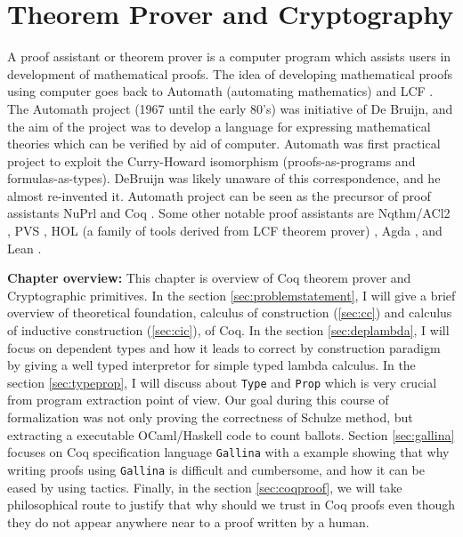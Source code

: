 \chapter{Theorem Prover and Cryptography}
\label{cha:theorem_crypto}
 

A proof assistant or theorem prover is a computer program which assists users in development 
of mathematical proofs. The idea of 
developing mathematical proofs using computer goes back to Automath (automating mathematics)
\citep{deBruijn1983} and LCF \citep{Milner:1972:IAS:942578.807067}. The 
Automath project (1967 until the early 80's)  was initiative of De Bruijn, and the aim of the project was to 
develop a language for expressing mathematical theories which can be verified by aid of computer.  
Automath was first 
practical project to exploit the Curry-Howard isomorphism (proofs-as-programs and formulas-as-types). 
DeBruijn  was likely unaware of this correspondence, and he almost re-invented it.
Automath project can be seen as the precursor of
 proof assistants NuPrl \citep{Constable:1986:IMN:10510} and Coq \citep{Bertot:2004:ITP}.  
 Some other notable  proof assistants are 
 Nqthm/ACl2 \citep{507872}, PVS \citep{Owre:1992:PPV:648230.752639},
 HOL (a family of tools derived from LCF theorem prover) \citep{Slind:2008:BOH:1459784.1459792}
 \citep{Harrison:1996:HLT:646184.682934} \citep{Nipkow:2002:IHP},
 Agda \citep{Norell:2008:DTP:1813347.1813352}, and Lean \citep{10.1007/978-3-319-21401-6_26}.


\textbf{Chapter overview:}
 This chapter is overview of Coq theorem prover and Cryptographic primitives. 
 In the section \ref{sec:problemstatement}, I will give a brief overview of 
 theoretical foundation, calculus of construction (\ref{sec:cc}) and calculus of inductive 
 construction (\ref{sec:cic}), of Coq. In the section \ref{sec:deplambda}, I will focus 
 on dependent types and  how it leads to correct by construction paradigm
 by giving a well typed interpretor for simple typed lambda calculus. 
 In the section \ref{sec:typeprop}, I will discuss about \texttt{Type} and \texttt{Prop}
 which is very crucial from program extraction point of view.  Our goal during 
 this course of formalization was not only proving the correctness of 
 Schulze method, but extracting a executable OCaml/Haskell code to count 
 ballots. Section \ref{sec:gallina} focuses on Coq specification language 
 \texttt{Gallina} with a example showing that why writing proofs using  
 \texttt{Gallina} is difficult and cumbersome, and how it can be eased by 
 using tactics. Finally, in the section  \ref{sec:coqproof}, we will take 
 philosophical route to justify that why should we trust in Coq proofs 
 even though they do not appear anywhere near to a proof written by 
 a human. 


